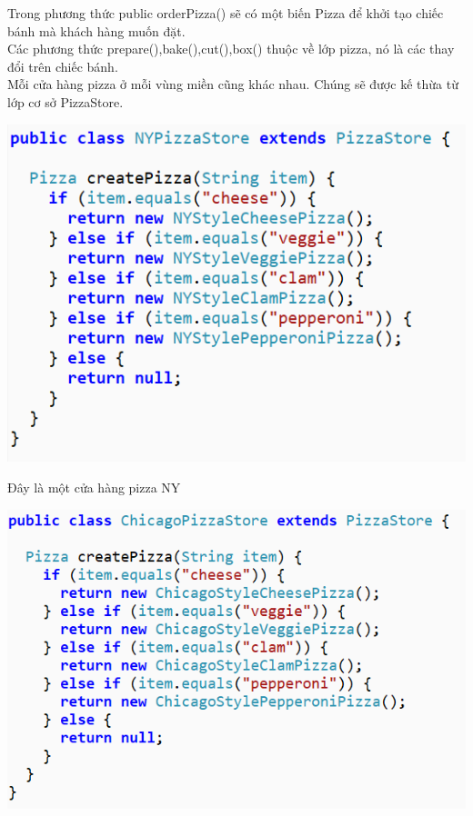 Trong phương thức public orderPizza() sẽ có một biến Pizza để khởi tạo chiếc bánh mà khách hàng muốn đặt.\\

Các phương thức prepare(),bake(),cut(),box() thuộc về lớp pizza, nó là các thay đổi trên chiếc bánh.\\

Mỗi cửa hàng pizza ở mỗi vùng miền cũng khác nhau. Chúng sẽ được kế thừa từ lớp cơ sở PizzaStore.\\

\begin{center}
	\includegraphics{GALLEYS/images/chapter5/images2}
\end{center}
Đây là một cửa hàng pizza NY\\
\begin{center}
	\includegraphics{GALLEYS/images/chapter5/images3}
\end{center}
